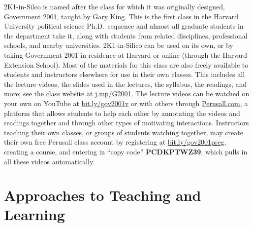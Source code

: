 \documentclass[12pt]{article}
\theoremstyle{definition}
\begin{document}
2K1-in-Silco is named after the class for which it was originally designed, Government 2001, taught by Gary King. This is the first class in the Harvard University political science Ph.D.\ sequence and almost all graduate students in the department take it, along with students from related disciplines, professional schools, and nearby universities. 2K1-in-Silico can be used on its own, or by taking Government 2001 in residence at Harvard or online (through the Harvard Extension School).  Most of the materials for this class are also freely available to students and instructors elsewhere for use in their own classes. This includes all the lecture videos, the slides used in the lectures, the syllabus, the readings, and more; see the class website at \href{https://j.mp/G2001}{j.mp/G2001}. The lecture videos can be watched on your own on YouTube at \href{https://bit.ly/gov2001v}{bit.ly/gov2001v} or with others through \href{https://perusall.com}{Perusall.com}, a platform that allows students to help each other by annotating the videos and readings together and through other types of motivating interactions. Instructors teaching their own classes, or groups of students watching together, may create their own free Perusall class account by registering at \href{https://bit.ly/gov2001preg}{bit.ly/gov2001preg}, creating a course, and entering in ``copy code'' \textbf{PCDKPTWZ39}, which pulls in all these videos automatically.

\section{Approaches to Teaching and Learning}
\end{document}
